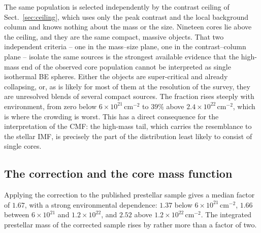 \documentclass[11pt,a4paper]{article}
\begin{document}
The same population is selected independently by the contrast ceiling of
Sect.~\ref{sec:ceiling}, which uses only the peak contrast and the local
background column and knows nothing about the mass or the size. Nineteen
cores lie above the ceiling, and they are the same compact, massive objects.
That two independent criteria -- one in the mass--size plane, one in the
contrast--column plane -- isolate the same sources is the strongest available
evidence that the high-mass end of the observed core population cannot be
interpreted as single isothermal BE spheres. Either the objects are
super-critical and already collapsing, or, as is likely for most of them at
the resolution of the survey, they are unresolved blends of several compact
sources. The fraction rises steeply with environment, from zero below
$6\times10^{21}\,\mathrm{cm^{-2}}$ to $39\%$ above
$2.4\times10^{22}\,\mathrm{cm^{-2}}$, which is where the crowding is worst.
This has a direct consequence for the interpretation of the CMF: the
high-mass tail, which carries the resemblance to the stellar IMF, is
precisely the part of the distribution least likely to consist of single
cores.

\subsection{The correction and the core mass function}
\label{sec:cmfcompare}

Applying the correction to the published prestellar sample gives a median
factor of $1.67$, with a strong environmental dependence: $1.37$ below
$6\times10^{21}\,\mathrm{cm^{-2}}$, $1.66$ between $6\times10^{21}$ and
$1.2\times10^{22}$, and $2.52$ above $1.2\times10^{22}\,\mathrm{cm^{-2}}$.
The integrated prestellar mass of the corrected sample rises by rather more
than a factor of two.
\end{document}
